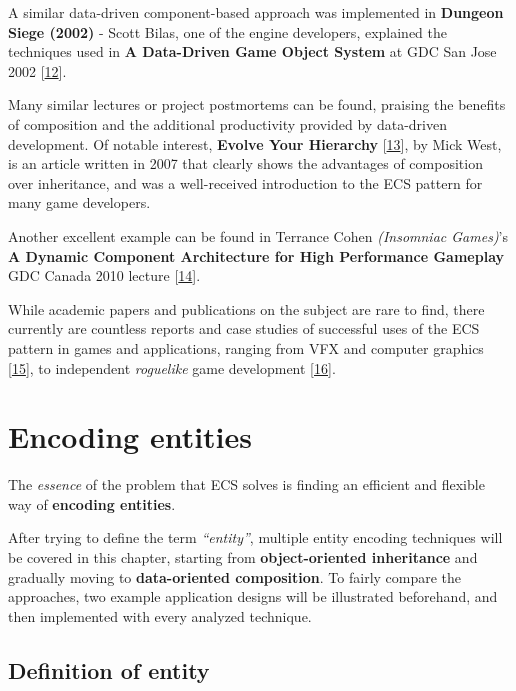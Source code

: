 \documentclass[twoside, 12pt, a4paper, openright]{book}
\begin{document}
A similar data-driven component-based approach was implemented in
\textbf{Dungeon Siege (2002)} - Scott Bilas, one of the engine
developers, explained the techniques used in \textbf{A Data-Driven Game
Object System} at GDC San Jose 2002
{[}\protect\hyperlink{ref-scottbilas_dungeonsiege_2002}{12}{]}.

Many similar lectures or project postmortems can be found, praising the
benefits of composition and the additional productivity provided by
data-driven development. Of notable interest, \textbf{Evolve Your
Hierarchy}
{[}\protect\hyperlink{ref-mickwest_evolveyourhierarchy_2007}{13}{]}, by
Mick West, is an article written in 2007 that clearly shows the
advantages of composition over inheritance, and was a well-received
introduction to the ECS pattern for many game developers.

Another excellent example can be found in Terrance Cohen
\emph{(Insomniac Games)}'s \textbf{A Dynamic Component Architecture for
High Performance Gameplay} GDC Canada 2010 lecture
{[}\protect\hyperlink{ref-terrancecohen_dynamiccomparchitecture_2010}{14}{]}.

While academic papers and publications on the subject are rare to find,
there currently are countless reports and case studies of successful
uses of the ECS pattern in games and applications, ranging from VFX and
computer graphics
{[}\protect\hyperlink{ref-stackexchange_ixe_answer}{15}{]}, to
independent \emph{roguelike} game development
{[}\protect\hyperlink{ref-sproggiwood_irdc_2015_talk}{16}{]}.

\hypertarget{chapter_encoding_entities}{\chapter{Encoding
entities}\label{chapter_encoding_entities}}

The \emph{essence} of the problem that ECS solves is finding an
efficient and flexible way of \textbf{encoding entities}.

After trying to define the term \emph{``entity''}, multiple entity
encoding techniques will be covered in this chapter, starting from
\textbf{object-oriented inheritance} and gradually moving to
\textbf{data-oriented composition}. To fairly compare the approaches,
two example application designs will be illustrated beforehand, and then
implemented with every analyzed technique.

\section{Definition of entity}\label{definition-of-entity}
\end{document}
